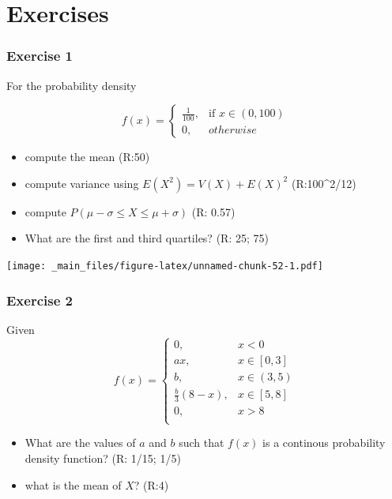 \documentclass[
]{book}
\providecommand{\tightlist}{%
  \setlength{\itemsep}{0pt}\setlength{\parskip}{0pt}}
\begin{document}
\hypertarget{exercises-4}{%
\section{Exercises}\label{exercises-4}}

\hypertarget{exercise-1-3}{%
\subsubsection{Exercise 1}\label{exercise-1-3}}

For the probability density

\[
    f(x)= 
\begin{cases}
    \frac{1}{100},& \text{if } x\in (0,100)\\
    0,& otherwise 
\end{cases}
\]

\begin{itemize}
\tightlist
\item
  compute the mean (R:50)
\item
  compute variance using \(E(X^2)=V(X)+E(X)^2\) (R:100\^{}2/12)
\item
  compute \(P(\mu-\sigma\leq X \leq \mu+\sigma)\) (R: 0.57)
\item
  What are the first and third quartiles? (R: 25; 75)
\end{itemize}

\texttt{[image: \_main\_files/figure-latex/unnamed-chunk-52-1.pdf]}

\hypertarget{exercise-2-3}{%
\subsubsection{Exercise 2}\label{exercise-2-3}}

Given
\[
    f(x)= 
\begin{cases}
0, & x < 0 \\
ax, & x \in [0,3] \\
b, & x \in (3,5) \\
\frac{b}{3}(8-x),& x \in [5,8]\\
0, & x > 8 \\
\end{cases}
\]

\begin{itemize}
\item
  What are the values of \(a\) and \(b\) such that \(f(x)\) is a continous probability density function? (R: 1/15; 1/5)
\item
  what is the mean of \(X\)? (R:4)
\end{itemize}
\end{document}
